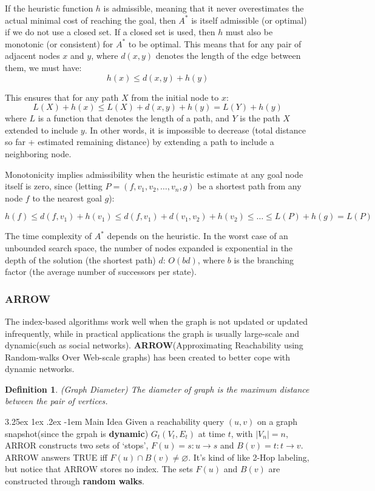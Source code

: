 \documentclass[11pt]{article}
\makeatletter
\renewcommand\paragraph{\@startsection{paragraph}{5}{\z@}%
	{3.25ex \@plus1ex \@minus.2ex}%
	{-1em}%
	{\normalfont\normalsize\bfseries}}
\newtheorem{definition}[theorem]{Definition}
\makeatother
\begin{document}
If the heuristic function $h$ is admissible, meaning that it never overestimates the actual minimal cost of reaching the goal, then $A^*$ is itself admissible (or optimal) if we do not use a closed set. If a closed set is used, then $h$ must also be monotonic (or consistent) for $A^*$ to be optimal. This means that for any pair of adjacent nodes $x$ and $y$, where $d(x,y)$ denotes the length of the edge between them, we must have:
$$
h(x) \leq d(x, y)+h(y)
$$

This ensures that for any path $X$ from the initial node to $x$:
$$
L(X)+h(x) \leq L(X)+d(x, y)+h(y)=L(Y)+h(y)
$$
where $L$ is a function that denotes the length of a path, and $Y$ is the path $X$ extended to include $y$. In other words, it is impossible to decrease (total distance so far + estimated remaining distance) by extending a path to include a neighboring node.

Monotonicity implies admissibility when the heuristic estimate at any goal node itself is zero, since (letting $P = \left(f, v_{1}, v_{2}, \ldots, v_{n}, g\right)$ be a shortest path from any node $f$ to the nearest goal $g$):

$$
h(f) \leq d\left(f, v_{1}\right)+h\left(v_{1}\right) \leq d\left(f, v_{1}\right)+d\left(v_{1}, v_{2}\right)+h\left(v_{2}\right) \leq \ldots \leq L(P)+h(g)=L(P)
$$

The time complexity of $A^*$ depends on the heuristic. In the worst case of an unbounded search space, the number of nodes expanded is exponential in the depth of the solution (the shortest path) $d$: $O(bd)$, where $b$ is the branching factor (the average number of successors per state).

\subsubsection{ARROW}
The index-based algorithms work well when the graph is not updated or updated infrequently, while in practical applications the graph is usually large-scale and dynamic(such as social networks). \textbf{ARROW}(Approximating Reachability using Random-walks Over Web-scale graphs)\cite{ref6} has been created to better cope with dynamic networks.

\begin{definition}{(Graph Diameter)}
	The diameter of graph is the maximum distance between the pair of vertices.
\end{definition}

\paragraph{Main Idea}  {
	Given a reachability query $(u,v)$ on a graph snapshot(since the grpah is \textbf{dynamic}) $G_t(V_t,E_t)$ at time $t$, with $|V_n| = n$, ARROR constructs two sets of `stops', $F(u) = {s:u\rightarrow s}$	and $B(v) = {t:t\rightarrow v}$. ARROW answers TRUE iff $F(u)\cap B(v)\neq \varnothing$. It's kind of like 2-Hop labeling, but notice that ARROW stores no index. The sets $F(u)$ and $B(v)$ are constructed through \textbf{random walks}.
}
\end{document}
